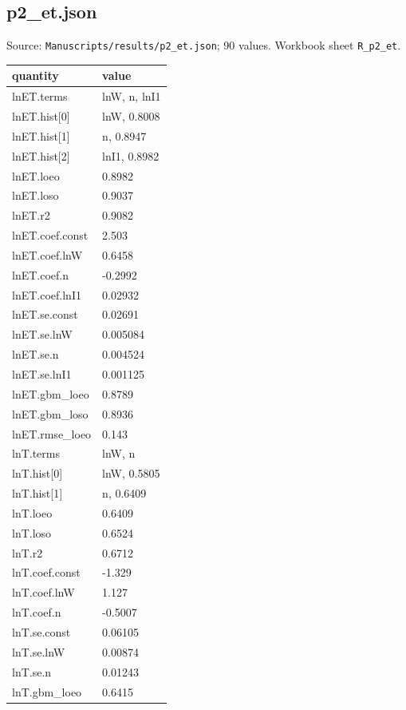\subsection*{p2\_et.json}
\noindent\small Source: \nolinkurl{Manuscripts/results/p2_et.json}; 90 values. Workbook sheet \texttt{R\_p2\_et}.\par
{\scriptsize\begin{longtable}{p{}p{}}\toprule\textbf{quantity} & \textbf{value}\\\midrule\endhead
{}lnET.terms & lnW, n, lnI1\\
{}lnET.hist[0] & lnW, 0.8008\\
{}lnET.hist[1] & n, 0.8947\\
{}lnET.hist[2] & lnI1, 0.8982\\
{}lnET.loeo & 0.8982\\
{}lnET.loso & 0.9037\\
{}lnET.r2 & 0.9082\\
{}lnET.coef.const & 2.503\\
{}lnET.coef.lnW & 0.6458\\
{}lnET.coef.n & -0.2992\\
{}lnET.coef.lnI1 & 0.02932\\
{}lnET.se.const & 0.02691\\
{}lnET.se.lnW & 0.005084\\
{}lnET.se.n & 0.004524\\
{}lnET.se.lnI1 & 0.001125\\
{}lnET.gbm\_loeo & 0.8789\\
{}lnET.gbm\_loso & 0.8936\\
{}lnET.rmse\_loeo & 0.143\\
{}lnT.terms & lnW, n\\
{}lnT.hist[0] & lnW, 0.5805\\
{}lnT.hist[1] & n, 0.6409\\
{}lnT.loeo & 0.6409\\
{}lnT.loso & 0.6524\\
{}lnT.r2 & 0.6712\\
{}lnT.coef.const & -1.329\\
{}lnT.coef.lnW & 1.127\\
{}lnT.coef.n & -0.5007\\
{}lnT.se.const & 0.06105\\
{}lnT.se.lnW & 0.00874\\
{}lnT.se.n & 0.01243\\
{}lnT.gbm\_loeo & 0.6415\\

\end{longtable}}
